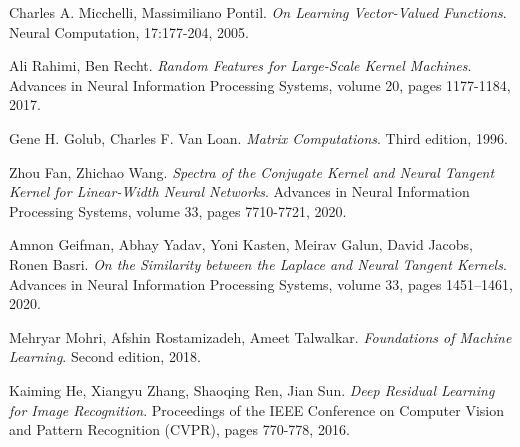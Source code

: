 \documentclass[11pt, a4paper]{article}
\begin{document}
\begin{thebibliography}{999}
 Charles A. Micchelli, Massimiliano Pontil. \textit{On Learning Vector-Valued Functions}. Neural Computation, 17:177-204, 2005.

 Ali Rahimi, Ben Recht. \textit{Random Features for Large-Scale Kernel Machines}. Advances in Neural Information Processing Systems, volume 20, pages 1177-1184, 2017.

 Gene H. Golub, Charles F. Van Loan. \textit{Matrix Computations}. Third edition, 1996.

 Zhou Fan, Zhichao Wang. \textit{Spectra of the Conjugate Kernel and Neural Tangent Kernel for Linear-Width Neural Networks}. Advances in Neural Information Processing Systems, volume 33, pages 7710-7721, 2020.

 Amnon Geifman, Abhay Yadav, Yoni Kasten, Meirav Galun, David Jacobs, Ronen Basri. \textit{On the Similarity between the Laplace and Neural Tangent Kernels}. Advances in Neural Information Processing Systems, volume 33,  pages 1451–1461, 2020.

 Mehryar Mohri, Afshin Rostamizadeh, Ameet Talwalkar. \textit{Foundations of Machine Learning}. Second edition, 2018.

 Kaiming He, Xiangyu Zhang, Shaoqing Ren, Jian Sun. \textit{Deep Residual Learning for Image Recognition}. Proceedings of the IEEE Conference on Computer Vision and Pattern Recognition (CVPR), pages 770-778, 2016.











\end{thebibliography}
\end{document}
